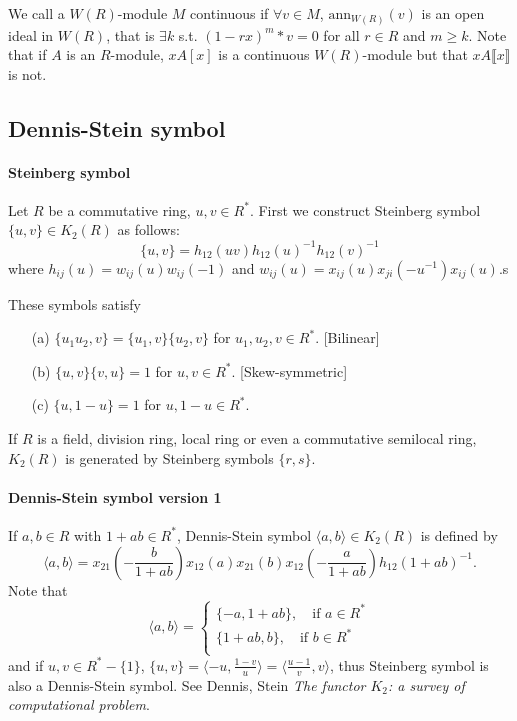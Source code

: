 We call a $W(R)$-module $M$ continuous if $\forall v \in M$, $\textrm{ann}_{W(R)}(v)$ is an open ideal in $W(R)$, that is $\exists k$ s.t. $(1-rx)^m *v =0$ for all $r\in R$ and $m\geqslant k$. Note that if $A$ is an $R$-module, $xA[x]$ is a continuous $W(R)$-module but that $xA\llbracket x\rrbracket $ is not.

\subsection{Dennis-Stein symbol} %
\label{sub:dennis_stein_symbols}
\paragraph{Steinberg symbol} %
\label{par:steinberg_symbol}


Let $R$ be a commutative ring, $u,v\in R^*$. First we construct Steinberg symbol $\{u,v\}\in K_2(R)$ as follows:
\[\{u,v\}=h_{12}(uv)h_{12}(u)^{-1}h_{12}(v)^{-1}\]
where $h_{ij}(u)=w_{ij}(u)w_{ij}(-1)$ and $w_{ij}(u)=x_{ij}(u)x_{ji}(-u^{-1})x_{ij}(u)$.s

These symbols satisfy
\begin{itemize}
	\item[(a)] $\{u_1u_2,v\}=\{u_1,v\}\{u_2,v\}$ for $u_1,u_2,v\in R^*$. [Bilinear]\\
	\item[(b)] $\{u,v\}\{v,u\}=1$ for $u,v \in R^*$. [Skew-symmetric]\\
	\item[(c)] $\{u,1-u\}=1$ for $u,1-u\in R^*$.
\end{itemize}
\begin{theorem}
	If $R$ is a field, division ring, local ring or even a commutative semilocal ring, $K_2(R)$ is generated by Steinberg symbols $\{r,s\}$.
\end{theorem}
\paragraph{Dennis-Stein symbol {\color{green}version 1}} %
\label{par:dennis_stein_symbol_greenversion_1}
If $a,b\in R$ with $1+ab \in R^*$, Dennis-Stein symbol $\langle a,b \rangle \in K_2(R)$ is defined by 
\[\langle a,b \rangle = x_{21}(-\frac{b}{1+ab})x_{12}(a)x_{21}(b)x_{12}(-\frac{a}{1+ab})h_{12}(1+ab)^{-1}.\]
Note that 
\[\langle a,b \rangle = \begin{cases}
	\{-a,1+ab\},\quad \mbox{if $a\in R^*$}\\
	\{1+ab,b\},\quad \mbox{if $b\in R^*$}\\
\end{cases}\]
and if $u,v\in R^*-\{1\}$, $\{u,v\}=\langle -u, \frac{1-v}{u} \rangle = \langle \frac{u-1}{v},v\rangle$, thus Steinberg symbol is also a Dennis-Stein symbol. See Dennis, Stein \emph{The functor $K_2$: a survey of computational problem}.

